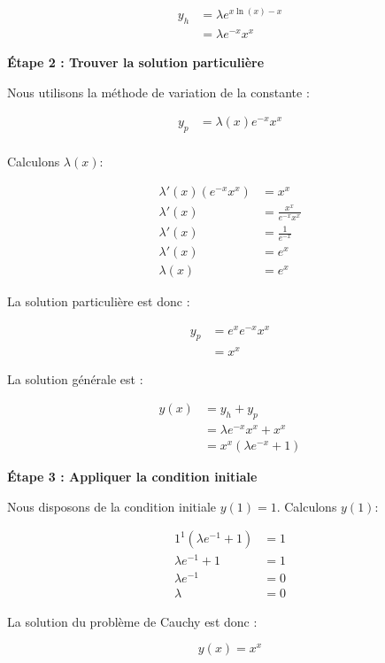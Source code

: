\documentclass{article}
\begin{document}
\begin{align*}
y_h &= \lambda e^{x \ln(x) - x} \\
    &= \lambda e^{-x} x^x
\end{align*}

\textbf{Étape 2 : Trouver la solution particulière}

Nous utilisons la méthode de variation de la constante :

\begin{align*}
y_p &= \lambda(x) e^{-x} x^x \\
\end{align*}

Calculons \( \lambda(x) \):

\begin{align*}
\lambda'(x)(e^{-x} x^x) &= x^x \\
\lambda'(x) &= \frac{x^x}{e^{-x} x^x} \\
\lambda'(x) &= \frac{1}{e^{-x}} \\
\lambda'(x) &= e^{x} \\
\lambda(x) &= e^{x}
\end{align*}

La solution particulière est donc :

\begin{align*}
y_p &= e^{x} e^{-x} x^x \\
    &= x^x
\end{align*}

La solution générale est :

\begin{align*}
y(x) &= y_h + y_p \\
    &= \lambda e^{-x} x^x + x^x \\
    &= x^x (\lambda e^{-x} + 1)
\end{align*}

\textbf{Étape 3 : Appliquer la condition initiale}

Nous disposons de la condition initiale \( y(1) = 1 \). Calculons \( y(1) \):

\begin{align*} 
1^1 (\lambda e^{-1} + 1) &= 1\\
    \lambda e^{-1} + 1 &= 1 \\
    \lambda e^{-1} &= 0 \\
    \lambda &= 0
\end{align*}

La solution du problème de Cauchy est donc :

\begin{equation*}
    y(x) = x^x
\end{equation*}
\end{document}
